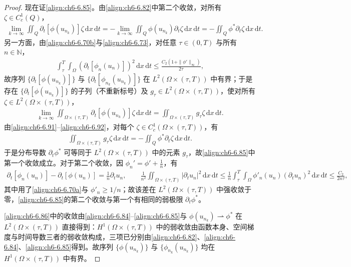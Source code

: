 \documentclass[../../main.tex]{subfiles}%
\begin{document}
\begin{proof}
现在证\eqref{align:ch6-6.85}。由\eqref{align:ch6-6.82}中第二个收敛，对所有 $\zeta\in C^1_c(Q)$，
\begin{align}
\lim_{k\to\infty}\iint_Q\partial_t[\phi(u_{n_k})]\zeta\,\mathrm{d}x\,\mathrm{d}t
=-\lim_{k\to\infty}\iint_Q\phi(u_{n_k})\partial_t\zeta\,\mathrm{d}x\,\mathrm{d}t
=-\iint_Q\phi^*\partial_t\zeta\,\mathrm{d}x\,\mathrm{d}t. \label{align:ch6-6.91}
\end{align}
另一方面，由\eqref{align:ch6-6.70b}与\eqref{align:ch6-6.73}，对任意 $\tau\in(0,T)$ 与所有 $n\in\mathbb{N}$，
\begin{align*}
\int_\tau^T\int_\Omega(\partial_t[\phi_n(u_n)])^2\,\mathrm{d}x\,\mathrm{d}t
\leqslant\frac{C_2(1+\|\phi'\|_\infty)}{2\tau},
\end{align*}
故序列 $\{\partial_t[\phi(u_{n_k})]\}$ 与 $\{\partial_t[\phi_{n_k}(u_{n_k})]\}$ 在 $L^2(\Omega\times(\tau,T))$ 中有界；于是存在 $\{\partial_t[\phi(u_{n_k})]\}$ 的子列（不重新标号）及 $g_\tau\in L^2(\Omega\times(\tau,T))$，使对所有 $\zeta\in L^2(\Omega\times(\tau,T))$，
\begin{align}
\lim_{k\to\infty}\iint_{\Omega\times(\tau,T)}\partial_t[\phi(u_{n_k})]\zeta\,\mathrm{d}x\,\mathrm{d}t
=\iint_{\Omega\times(\tau,T)}g_\tau\zeta\,\mathrm{d}x\,\mathrm{d}t. \label{align:ch6-6.92}
\end{align}
由\eqref{align:ch6-6.91}--\eqref{align:ch6-6.92}，对每个 $\zeta\in C^1_c(\Omega\times(\tau,T))$，有
\begin{align}
\iint_{\Omega\times(\tau,T)}g_\tau\zeta\,\mathrm{d}x\,\mathrm{d}t
=-\iint_Q\phi^*\partial_t\zeta\,\mathrm{d}x\,\mathrm{d}t. \label{align:ch6-6.93}
\end{align}
于是分布导数 $\partial_t\phi^*$ 可等同于 $L^2(\Omega\times(\tau,T))$ 中的元素 $g_\tau$，故\eqref{align:ch6-6.85}中第一个收敛成立。对于第二个收敛，因 $\phi_n'=\phi'+\frac{1}{n}$，有
\begin{align*}
\partial_t[\phi_n(u_n)]-\partial_t[\phi(u_n)]=\frac{1}{n}\partial_tu_n,
\qquad
\frac{1}{n^2}\iint_{\Omega\times(\tau,T)}|\partial_tu_n|^2\,\mathrm{d}x\,\mathrm{d}t
\leqslant\frac{1}{n}\int_\tau^T\int_\Omega\phi'_n(u_n)(\partial_tu_n)^2\,\mathrm{d}x\,\mathrm{d}t
\leqslant\frac{C_2}{2n\tau},
\end{align*}
其中用了\eqref{align:ch6-6.70a}与 $\phi'_n\geqslant1/n$；故该差在 $L^2(\Omega\times(\tau,T))$ 中强收敛于零，\eqref{align:ch6-6.85}的第二个收敛与第一个有相同的弱极限 $\partial_t\phi^*$。

\eqref{align:ch6-6.86}中的收敛由\eqref{align:ch6-6.84}--\eqref{align:ch6-6.85}与 $\phi(u_{n_k})\rightharpoonup\phi^*$ 在 $L^2(\Omega\times(\tau,T))$ 直接得到：$H^1(\Omega\times(\tau,T))$ 中的弱收敛由函数本身、空间梯度与时间导数三者的弱收敛构成，三项已分别由\eqref{align:ch6-6.82}、\eqref{align:ch6-6.84}、\eqref{align:ch6-6.85}得到。故序列 $\{\phi(u_{n_k})\}$ 与 $\{\phi_{n_k}(u_{n_k})\}$ 均在 $H^1(\Omega\times(\tau,T))$ 中有界。


\end{proof}
\end{document}
